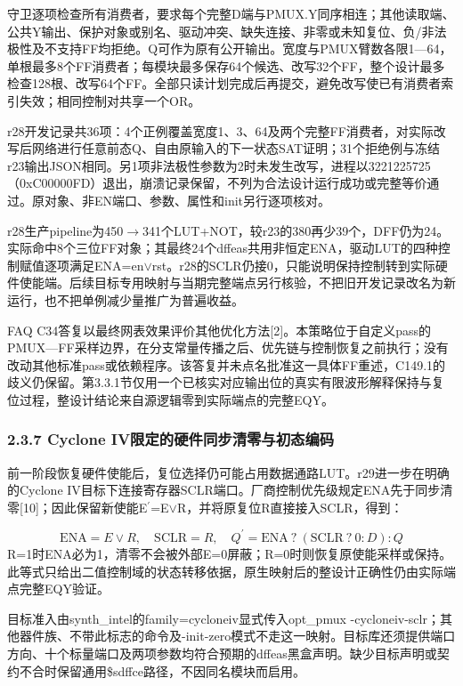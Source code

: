 \documentclass[UTF8,fontset=fandol,12pt]{ctexart}
\begin{document}
守卫逐项检查所有消费者，要求每个完整D端与PMUX.Y同序相连；其他读取端、公共Y输出、保护对象或别名、驱动冲突、缺失连接、非零或未知复位、负/\allowbreak{}非法极性及不支持FF均拒绝。Q可作为原有公开输出。宽度与PMUX臂数各限1—64，单根最多8个FF消费者；每模块最多保存64个候选、改写32个FF，整个设计最多检查128根、改写64个FF。全部只读计划完成后再提交，避免改写使已有消费者索引失效；相同控制对共享一个OR。

r28开发记录共36项：4个正例覆盖宽度1、3、64及两个完整FF消费者，对实际改写后网络进行任意前态Q、自由原输入的下一状态SAT证明；31个拒绝例与冻结r23输出JSON相同。另1项非法极性参数为2时未发生改写，进程以3221225725（0xC00000FD）退出，崩溃记录保留，不列为合法设计运行成功或完整等价通过。原对象、非EN端口、参数、属性和init另行逐项核对。

r28生产pipeline为450\ensuremath{\rightarrow}341个LUT+NOT，较r23的380再少39个，DFF仍为24。实际命中8个三位FF对象；其最终24个dffeas共用非恒定ENA，驱动LUT的四种控制赋值逐项满足ENA=en\ensuremath{\lor}rst。r28的SCLR仍接0，只能说明保持控制转到实际硬件使能端。后续目标专用映射与当期完整端点另行核验，不把旧开发记录改名为新运行，也不把单例减少量推广为普遍收益。

FAQ C34答复以最终网表效果评价其他优化方法[2]。本策略位于自定义pass的PMUX—FF采样边界，在分支常量传播之后、优先链与控制恢复之前执行；没有改动其他标准pass或依赖程序。该答复并未点名批准这一具体FF重述，C149.1的歧义仍保留。第3.3.1节仅用一个已核实对应输出位的真实有限波形解释保持与复位过程，整设计结论来自源逻辑零到实际端点的完整EQY。

\Needspace{237.6pt}\subsubsection*{2.3.7  Cyclone IV限定的硬件同步清零与初态编码}
前一阶段恢复硬件使能后，复位选择仍可能占用数据通路LUT。r29进一步在明确的Cyclone IV目标下连接寄存器SCLR端口。厂商控制优先级规定ENA先于同步清零[10]；因此保留新使能E\ensuremath{^{\prime}}=E\ensuremath{\lor}R，并将原复位R直接接入SCLR，得到：

\[
\mathrm{ENA}=E\lor R,\quad \mathrm{SCLR}=R,\quad Q^{\prime}=\mathrm{ENA}\ ?\ (\mathrm{SCLR}\ ?\ 0:D):Q
\]
R=1时ENA必为1，清零不会被外部E=0屏蔽；R=0时则恢复原使能采样或保持。此等式只给出二值控制域的状态转移依据，原生映射后的整设计正确性仍由实际端点完整EQY验证。

目标准入由synth\_\allowbreak{}intel的family=cycloneiv显式传入opt\_\allowbreak{}pmux -cycloneiv-sclr；其他器件族、不带此标志的命令及-init-zero模式不走这一映射。目标库还须提供端口方向、十个标量端口及两项参数均符合预期的dffeas黑盒声明。缺少目标声明或契约不合时保留通用\$sdffce路径，不因同名模块而启用。
\end{document}
